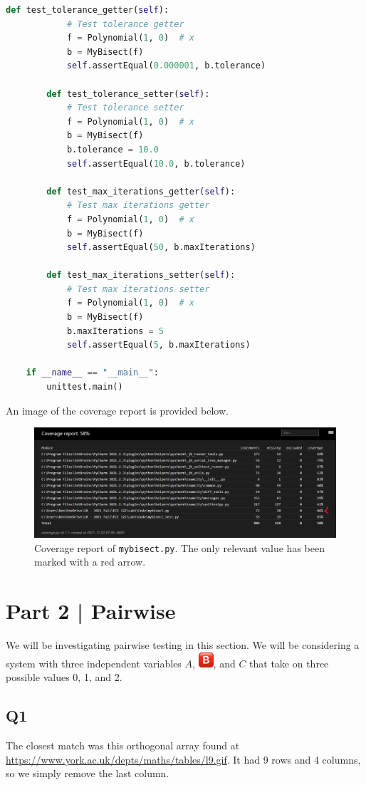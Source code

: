 \documentclass[12pt, letterpaper, titlepage]{article}
\newcommand{\B}{\includegraphics[height=1.5em, valign=B, raise=-0.2em]{BigB.png}}
\begin{document}
\begin{lstlisting}[language=Python, style=code_style]
        def test_tolerance_getter(self):
            # Test tolerance getter
            f = Polynomial(1, 0)  # x
            b = MyBisect(f)
            self.assertEqual(0.000001, b.tolerance)
    
        def test_tolerance_setter(self):
            # Test tolerance setter
            f = Polynomial(1, 0)  # x
            b = MyBisect(f)
            b.tolerance = 10.0
            self.assertEqual(10.0, b.tolerance)
    
        def test_max_iterations_getter(self):
            # Test max iterations getter
            f = Polynomial(1, 0)  # x
            b = MyBisect(f)
            self.assertEqual(50, b.maxIterations)
    
        def test_max_iterations_setter(self):
            # Test max iterations setter
            f = Polynomial(1, 0)  # x
            b = MyBisect(f)
            b.maxIterations = 5
            self.assertEqual(5, b.maxIterations)
    
    if __name__ == "__main__":
        unittest.main()
\end{lstlisting}
An image of the coverage report is provided below.
\begin{figure}[H]
    \caption{Coverage report of \lstinline{mybisect.py}. The only relevant value has been marked with a red arrow.}
    \includegraphics[width=\textwidth]{CodeCoverage1.png}
    \centering
\end{figure}

\section*{Part 2 | Pairwise}
We will be investigating pairwise testing in this section. We will be considering a system with three independent variables $A$, \B, and $C$ that take on three possible values 0, 1, and 2.

\subsection*{Q1}
The closest match was this orthogonal array found at \url{https://www.york.ac.uk/depts/maths/tables/l9.gif}. It had 9 rows and 4 columns, so we simply remove the last column.
\end{document}
